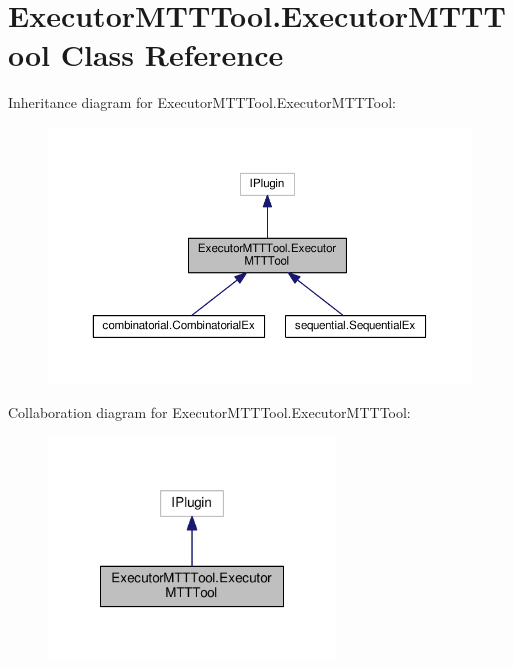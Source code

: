 \hypertarget{classExecutorMTTTool_1_1ExecutorMTTTool}{\section{Executor\-M\-T\-T\-Tool.\-Executor\-M\-T\-T\-Tool Class Reference}
\label{classExecutorMTTTool_1_1ExecutorMTTTool}
}


Inheritance diagram for Executor\-M\-T\-T\-Tool.\-Executor\-M\-T\-T\-Tool\-:
\nopagebreak
\begin{figure}[H]
\begin{center}
\leavevmode
\includegraphics[width=350pt]{classExecutorMTTTool_1_1ExecutorMTTTool__inherit__graph}
\end{center}
\end{figure}


Collaboration diagram for Executor\-M\-T\-T\-Tool.\-Executor\-M\-T\-T\-Tool\-:
\nopagebreak
\begin{figure}[H]
\begin{center}
\leavevmode
\includegraphics[width=216pt]{classExecutorMTTTool_1_1ExecutorMTTTool__coll__graph}
\end{center}
\end{figure}
